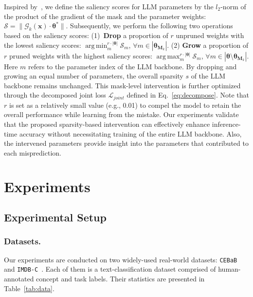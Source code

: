 \documentclass[letterpaper]{article} %
\DeclareMathOperator*{\argmax}{arg\,max}
\DeclareMathOperator*{\argmin}{arg\,min}
\begin{document}
Inspired by~\citet{evci2020rigging,sun2023simple}, we define the saliency scores for LLM parameters by the $l_2$-norm of the product of the gradient of the mask and the parameter weights: $\mathcal{S} = \|\mathcal{G}_k(\bm{x}) \cdot \bm{\theta}^\ast \|$. Subsequently, we perform the following two operations based on the saliency scores: (1)~\textbf{Drop} a proportion of $r$ unpruned weights with the lowest saliency scores: $\argmin_m^{r\cdot |\bm{\theta}|} \mathcal{S}_m$, $\forall m \in |\bm{\theta}_{\bm{M}_k}|$. (2) \textbf{Grow} a proportion of $r$ pruned weights with the highest saliency scores: $\argmax_m^{r\cdot |\bm{\theta}|} \mathcal{S}_m$, $\forall m \in |\bm{\theta} \setminus \bm{\theta}_{\bm{M}_k}|$. Here $m$ refers to the parameter index of the LLM backbone. By dropping and growing an equal number of parameters, the overall sparsity $s$ of the LLM backbone remains unchanged. This mask-level intervention is further optimized through the decomposed joint loss $\mathcal{L}_{joint}$ defined in Eq.~\eqref{eq:decompose}. Note that $r$ is set as a relatively small value (e.g., 0.01) to compel the model to retain the overall performance while learning from the mistake. Our experiments validate that the proposed sparsity-based intervention can effectively enhance inference-time accuracy without necessitating training of the entire LLM backbone. Also, the intervened parameters provide insight into the parameters that contributed to each misprediction. 
  




\section{Experiments}
\subsection{Experimental Setup}
\subsubsection{Datasets.} Our experiments are conducted on two widely-used real-world datasets: \texttt{CEBaB}~\citep{abraham2022cebab} and \texttt{IMDB-C}~\cite{tan2023cbm}. Each of them is a text-classification dataset comprised of human-annotated concept and task labels. Their statistics are presented in Table~\ref{tab:data}.
\end{document}
